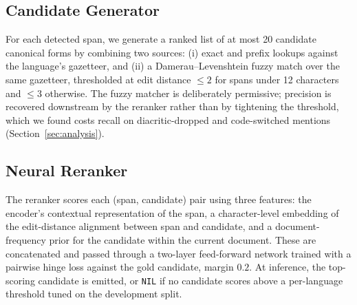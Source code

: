 \subsection{Candidate Generator}
For each detected span, we generate a ranked list of at most 20 candidate
canonical forms by combining two sources: (i) exact and prefix lookups
against the language's gazetteer, and (ii) a Damerau--Levenshtein fuzzy
match over the same gazetteer, thresholded at edit distance $\leq 2$ for
spans under 12 characters and $\leq 3$ otherwise. The fuzzy matcher is
deliberately permissive; precision is recovered downstream by the
reranker rather than by tightening the threshold, which we found costs
recall on diacritic-dropped and code-switched mentions (Section~\ref{sec:analysis}).

\subsection{Neural Reranker}
The reranker scores each (span, candidate) pair using three features: the
encoder's contextual representation of the span, a character-level
embedding of the edit-distance alignment between span and candidate, and
a document-frequency prior for the candidate within the current document.
These are concatenated and passed through a two-layer feed-forward network
trained with a pairwise hinge loss against the gold candidate, margin
$0.2$. At inference, the top-scoring candidate is emitted, or
\texttt{NIL} if no candidate scores above a per-language threshold tuned
on the development split.
